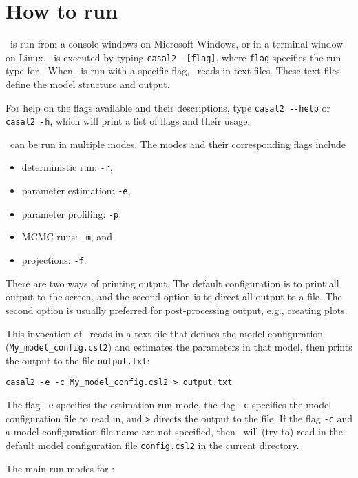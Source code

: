\section{How to run \CNAME}\label{sec:intro}

\CNAME\ is run from a console windows on Microsoft Windows, or in a terminal window on Linux. \CNAME\ is executed by typing \texttt{casal2 -[flag]}, where \texttt{flag} specifies the run type for \CNAME. When \CNAME\ is run with a specific flag, \CNAME\ reads in text files. These text files define the model structure and output.

For help on the flags available and their descriptions, type \texttt{casal2 -{}-help} or \texttt{casal2 -h}, which will print a list of flags and their usage.

\CNAME\ can be run in multiple modes. The modes and their corresponding flags include

\begin{itemize}
	\item deterministic run: \texttt{-r},
	\item parameter estimation: \texttt{-e},
	\item parameter profiling: \texttt{-p},
	\item MCMC runs: \texttt{-m}, and
	\item projections: \texttt{-f}.
\end{itemize}

There are two ways of printing output. The default configuration is to print all output to the screen, and the second option is to direct all output to a file. The second option is usually preferred for post-processing output, e.g., creating plots.

This invocation of \CNAME\ reads in a text file that defines the model configuration (\texttt{My\_model\_config.csl2}) and estimates the parameters in that model, then prints the output to the file \texttt{output.txt}:

\texttt{casal2 -e -c My\_model\_config.csl2 > output.txt}

The flag \texttt{-e} specifies the estimation run mode, the flag \texttt{-c} specifies the model configuration file to read in, and \texttt{>} directs the output to the file. If the flag \texttt{-c} and a model configuration file name are not specified, then \CNAME\ will (try to) read in the default model configuration file \texttt{config.csl2} in the current directory.

The main run modes for \CNAME:

